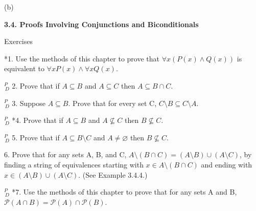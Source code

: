 \documentclass{article}
\begin{document}
(b)

\vspace{50pt}

\textbf{3.4. Proofs Involving Conjunctions and Biconditionals}

Exercises
\vspace{30pt}

*1. Use the methods of this chapter to prove that $\forall x(P(x) \land Q(x))$ is
equivalent to $\forall x P(x) \land \forall x Q(x)$.
\vspace{30pt}



\vspace{30pt}

$^{\textit{P}}_{\, \textit{D}}$ 2. Prove that if $A \subseteq B$ and $A \subseteq C$ then $A \subseteq B \cap C$.
\vspace{30pt}


\vspace{30pt}

$^{\textit{P}}_{\, \textit{D}}$ 3. Suppose $A \subseteq B$. Prove that for every set C, $C \setminus B \subseteq C \setminus A$.
\vspace{30pt}



\vspace{30pt}

$^{\textit{P}}_{\, \textit{D}}$ *4. Prove that if $A \subseteq B$ and $A \nsubseteq C$ then $B \nsubseteq C$.
\vspace{30pt}



\vspace{30pt}

$^{\textit{P}}_{\, \textit{D}}$ 5. Prove that if $A \subseteq B \setminus C$ and $A \neq \varnothing$ then $B \nsubseteq C$.
\vspace{30pt}



\vspace{30pt}

6. Prove that for any sets A, B, and C, $A \setminus (B \cap C) = (A \setminus B) \cup (A \setminus C)$,
by finding a string of equivalences starting with $x \in A \setminus (B \cap C)$ and
ending with $x \in (A \setminus B) \cup (A \setminus C)$. (See Example 3.4.4.)
\vspace{30pt}



\vspace{30pt}

$^{\textit{P}}_{\, \textit{D}}$ *7. Use the methods of this chapter to prove that for any sets A and B, $\mathcal{P} (A \cap B) = \mathcal{P} (A) \cap \mathcal{P} (B)$.
\vspace{30pt}
\end{document}
